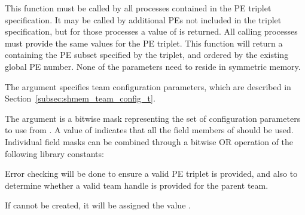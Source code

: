\begin{apidefinition}
{This function must be called by all processes contained in the \ac{PE} triplet
specification. It may be called by additional \acp{PE} not included in the
triplet specification, but for those processes a  value of
 is returned. All calling processes must provide the
same values for the \ac{PE} triplet. This function will return a 
containing the \ac{PE} subset specified by the triplet, and ordered by the
existing global \ac{PE} number. None of the parameters need to reside in
symmetric memory.

The  argument specifies team configuration parameters, which are
described in Section~\ref{subsec:shmem_team_config_t}.

The  argument is a bitwise mask representing the set of
configuration parameters to use from .
A  value of  indicates that all the field members
of  should be used.
Individual field masks can be combined through a bitwise OR operation
of the following library constants:

{
}

Error checking will be done to ensure a valid \ac{PE} triplet is provided,
and also to determine whether a valid team handle is provided for the
parent team.

If  cannot be created, it will be assigned the value
.
}



\begin{apiexamples}

\end{apiexamples}

\end{apidefinition}
